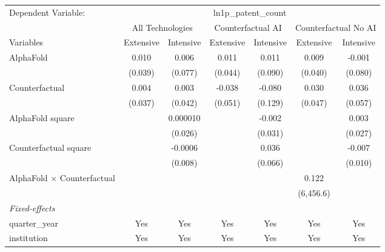 \begingroup
\centering
\begin{tabular}{lcccccc}
   \tabularnewline \midrule \midrule
   Dependent Variable: & \multicolumn{6}{c}{ln1p\_patent\_count}\\
 & \multicolumn{2}{c}{All Technologies} & \multicolumn{2}{c}{Counterfactual AI} & \multicolumn{2}{c}{Counterfactual No AI} \\
\cmidrule(lr){1-1}\cmidrule(lr){2-3} \cmidrule(lr){4-5} \cmidrule(lr){6-7}
Variables & \multicolumn{1}{c}{Extensive} & \multicolumn{1}{c}{Intensive} & \multicolumn{1}{c}{Extensive} & \multicolumn{1}{c}{Intensive} & \multicolumn{1}{c}{Extensive} & \multicolumn{1}{c}{Intensive} \\
\cmidrule(lr){1-1}\cmidrule(lr){2-2} \cmidrule(lr){3-3} \cmidrule(lr){4-4} \cmidrule(lr){5-5} \cmidrule(lr){6-6} \cmidrule(lr){7-7}
   AlphaFold                          & 0.010   & 0.006    & 0.011   & 0.011   & 0.009     & -0.001\\   
                                      & (0.039) & (0.077)  & (0.044) & (0.090) & (0.040)   & (0.080)\\   
   Counterfactual                     & 0.004   & 0.003    & -0.038  & -0.080  & 0.030     & 0.036\\   
                                      & (0.037) & (0.042)  & (0.051) & (0.129) & (0.047)   & (0.057)\\   
   AlphaFold square                   &         & 0.000010 &         & -0.002  &           & 0.003\\   
                                      &         & (0.026)  &         & (0.031) &           & (0.027)\\   
   Counterfactual square              &         & -0.0006  &         & 0.036   &           & -0.007\\   
                                      &         & (0.008)  &         & (0.066) &           & (0.010)\\   
   AlphaFold $\times$ Counterfactual  &         &          &         &         & 0.122     &   \\   
                                      &         &          &         &         & (6,456.6) &   \\   
   \midrule
   \emph{Fixed-effects}\\
   quarter\_year                      & Yes     & Yes      & Yes     & Yes     & Yes       & Yes\\  
   institution                        & Yes     & Yes      & Yes     & Yes     & Yes       & Yes\\  

\end{tabular}

